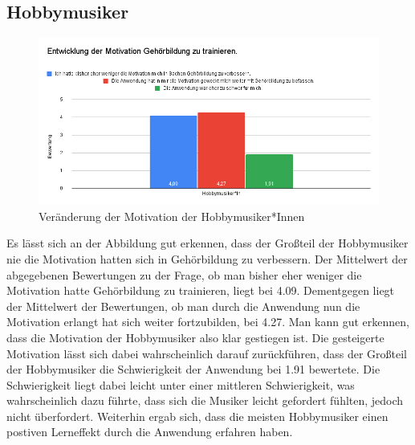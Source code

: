 \subsection*{Hobbymusiker}
\begin{figure}[H]
    \centering
    \includegraphics[width=1\textwidth]{Bilder/eval-entwicklungMotivationHobby-vergleich.png}
    \caption{Veränderung der Motivation der Hobbymusiker*Innen}
\end{figure}
Es lässt sich an der Abbildung gut erkennen, dass der Großteil der Hobbymusiker nie die Motivation hatten sich in Gehörbildung zu verbessern. Der Mittelwert der abgegebenen Bewertungen zu der Frage, ob man bisher eher weniger die Motivation hatte Gehörbildung zu trainieren, liegt bei 4.09. Dementgegen liegt der Mittelwert der Bewertungen, ob man durch die Anwendung nun die Motivation erlangt hat sich weiter fortzubilden, bei 4.27. Man kann gut erkennen, dass die Motivation der Hobbymusiker also klar gestiegen ist. Die gesteigerte Motivation lässt sich dabei wahrscheinlich darauf zurückführen, dass der Großteil der Hobbymusiker die Schwierigkeit der Anwendung bei 1.91 bewertete. Die Schwierigkeit liegt dabei leicht unter einer mittleren Schwierigkeit, was wahrscheinlich dazu führte, dass sich die Musiker leicht gefordert fühlten, jedoch nicht überfordert. Weiterhin ergab sich, dass die meisten Hobbymusiker einen postiven Lerneffekt durch die Anwendung erfahren haben.  

